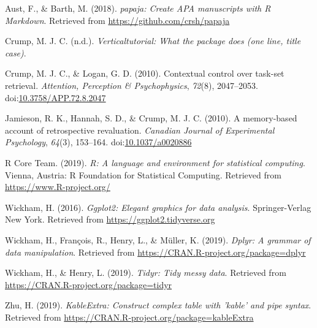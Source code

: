 \documentclass[
  man]{apa6}
\newlength{\cslhangindent}
\newenvironment{cslreferences}%
  {\setlength{\parindent}{0pt}%
  \everypar{\setlength{\hangindent}{\cslhangindent}}\ignorespaces}%
  {\par}
\begin{document}
\hypertarget{refs}{}
\begin{cslreferences}
\leavevmode\hypertarget{ref-R-papaja}{}%
Aust, F., \& Barth, M. (2018). \emph{papaja: Create APA manuscripts with R Markdown}. Retrieved from \url{https://github.com/crsh/papaja}

\leavevmode\hypertarget{ref-R-verticaltutorial}{}%
Crump, M. J. C. (n.d.). \emph{Verticaltutorial: What the package does (one line, title case)}.

\leavevmode\hypertarget{ref-crumpContextualControlTaskset2010}{}%
Crump, M. J. C., \& Logan, G. D. (2010). Contextual control over task-set retrieval. \emph{Attention, Perception \& Psychophysics}, \emph{72}(8), 2047--2053. doi:\href{https://doi.org/10.3758/APP.72.8.2047}{10.3758/APP.72.8.2047}

\leavevmode\hypertarget{ref-jamiesonMemorybasedAccountRetrospective2010}{}%
Jamieson, R. K., Hannah, S. D., \& Crump, M. J. C. (2010). A memory-based account of retrospective revaluation. \emph{Canadian Journal of Experimental Psychology}, \emph{64}(3), 153--164. doi:\href{https://doi.org/10.1037/a0020886}{10.1037/a0020886}

\leavevmode\hypertarget{ref-R-base}{}%
R Core Team. (2019). \emph{R: A language and environment for statistical computing}. Vienna, Austria: R Foundation for Statistical Computing. Retrieved from \url{https://www.R-project.org/}

\leavevmode\hypertarget{ref-R-ggplot2}{}%
Wickham, H. (2016). \emph{Ggplot2: Elegant graphics for data analysis}. Springer-Verlag New York. Retrieved from \url{https://ggplot2.tidyverse.org}

\leavevmode\hypertarget{ref-R-dplyr}{}%
Wickham, H., François, R., Henry, L., \& Müller, K. (2019). \emph{Dplyr: A grammar of data manipulation}. Retrieved from \url{https://CRAN.R-project.org/package=dplyr}

\leavevmode\hypertarget{ref-R-tidyr}{}%
Wickham, H., \& Henry, L. (2019). \emph{Tidyr: Tidy messy data}. Retrieved from \url{https://CRAN.R-project.org/package=tidyr}

\leavevmode\hypertarget{ref-R-kableExtra}{}%
Zhu, H. (2019). \emph{KableExtra: Construct complex table with 'kable' and pipe syntax}. Retrieved from \url{https://CRAN.R-project.org/package=kableExtra}
\end{cslreferences}

\endgroup
\end{document}
